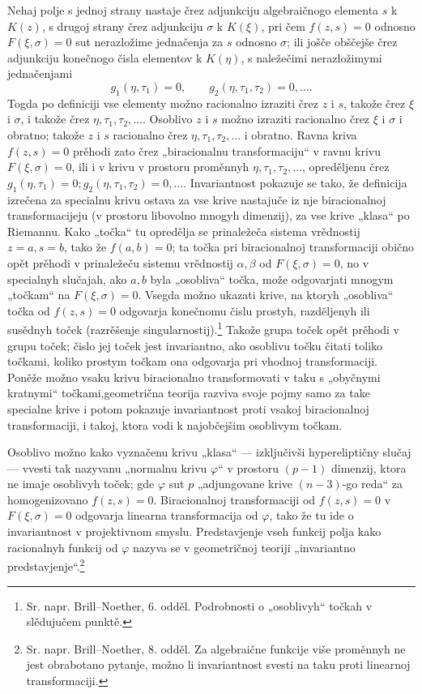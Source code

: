 \documentclass[11pt]{article}
\begin{document}
Nehaj polje s jednoj strany nastaje črez adjunkciju algebraičnogo elementa \(s\) k \(K(z)\), s drugoj strany črez adjunkciju \(\sigma\) k \(K(\xi)\), pri čem \(f(z,s)=0\) odnosno \(F(\xi,\sigma)=0\) sut nerazložime jednačenja za \(s\) odnosno \(\sigma\); ili jošče obščejše črez adjunkciju konečnogo čisla elementov k \(K(\eta)\), s naležečimi nerazložimymi jednačenjami
\[
g_1(\eta,\tau_1)=0,\qquad g_2(\eta,\tau_1,\tau_2)=0,\ldots .
\]
Togda po definiciji vse elementy možno racionalno izraziti črez \(z\) i \(s\), takože črez \(\xi\) i \(\sigma\), i takože črez \(\eta,\tau_1,\tau_2,\ldots\). Osoblivo \(z\) i \(s\) možno izraziti racionalno črez \(\xi\) i \(\sigma\) i obratno; takože \(z\) i \(s\) racionalno črez \(\eta,\tau_1,\tau_2,\ldots\) i obratno. Ravna kriva \(f(z,s)=0\) prěhodi zato črez „biracionalnu transformaciju“ v ravnu krivu \(F(\xi,\sigma)=0\), ili i v krivu v prostoru proměnnyh \(\eta,\tau_1,\tau_2,\ldots\), opreděljenu črez \(g_1(\eta,\tau_1)=0; g_2(\eta,\tau_1,\tau_2)=0,\ldots\). Invariantnost pokazuje se tako, že definicija izrečena za specialnu krivu ostava za vse krive nastajuče iz nje biracionalnoj transformacijeju (v prostoru libovolno mnogyh dimenzij), za vse krive „klasa“ po Riemannu. Kako „točka“ tu opredělja se prinaležeča sistema vrědnostij \(z=a,s=b\), tako že \(f(a,b)=0\); ta točka pri biracionalnoj transformaciji obično opět prěhodi v prinaležeču sistemu vrědnostij \(\alpha,\beta\) od \(F(\xi,\sigma)=0\), no v specialnyh slučajah, ako \(a,b\) byla „osobliva“ točka, može odgovarjati mnogym „točkam“ na \(F(\xi,\sigma)=0\). Vsegda možno ukazati krive, na ktoryh „osobliva“ točka od \(f(z,s)=0\) odgovarja konečnomu čislu prostyh, razděljenyh ili susědnyh toček (razrěšenje singularnostij).\footnote{Sr. napr. Brill--Noether, 6. odděl. Podrobnosti o „osoblivyh“ točkah v slědujučem punktě.} Takože grupa toček opět prěhodi v grupu toček; čislo jej toček jest invariantno, ako osoblivu točku čitati toliko točkami, koliko prostym točkam ona odgovarja pri vhodnoj transformaciji. Poněže možno vsaku krivu biracionalno transformovati v taku s „obyčnymi kratnymi“ točkami,\footnotemark[\value{footnote}] geometrična teorija razviva svoje pojmy samo za take specialne krive i potom pokazuje invariantnost proti vsakoj biracionalnoj transformaciji, i takoj, ktora vodi k najobčejšim osoblivym točkam.

Osoblivo možno kako vyznačenu krivu „klasa“ --- izključivši hypereliptičny slučaj --- vvesti tak nazyvanu „normalnu krivu \(\varphi\)“ v prostoru \((p-1)\) dimenzij, ktora ne imaje osoblivyh toček; gde \(\varphi\) sut \(p\) „adjungovane krive \((n-3)\)-go reda“ za homogenizovano \(f(z,s)=0\). Biracionalnoj transformaciji od \(f(z,s)=0\) v \(F(\xi,\sigma)=0\) odgovarja linearna transformacija od \(\varphi\), tako že tu ide o invariantnost v projektivnom smyslu. Predstavjenje vseh funkcij polja kako racionalnyh funkcij od \(\varphi\) nazyva se v geometričnoj teoriji „invariantno predstavjenje“.\footnote{Sr. napr. Brill--Noether, 8. odděl. Za algebraične funkcije više proměnnyh ne jest obrabotano pytanje, možno li invariantnost svesti na taku proti linearnoj transformaciji.}
\end{document}
